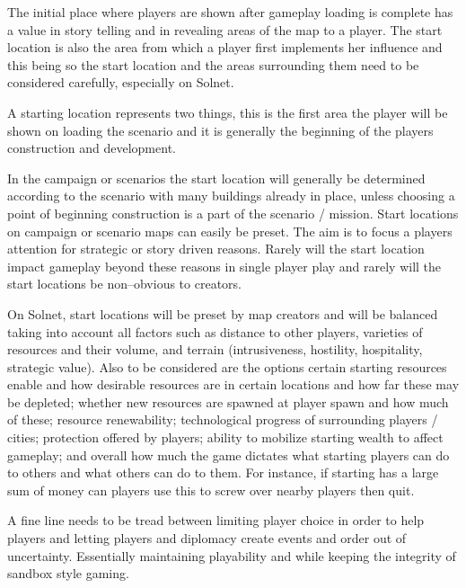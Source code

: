 
The initial place where players are shown after gameplay loading is complete has a value in story telling and in revealing areas of the map to a player. The start location is also the area from which a player first implements her influence and this being so the start location and the areas surrounding them need to be considered carefully, especially on Solnet.

A starting location represents two things, this is the first area the player will be shown on loading the scenario and it is generally the beginning of the players construction and development.  

In the campaign or scenarios the start location will generally be determined according to the scenario with many buildings already in place, unless choosing a point of beginning construction is a part of the scenario / mission. Start locations on campaign or scenario maps can easily be preset. The aim is to focus a players attention for strategic or story driven reasons. Rarely will the start location impact gameplay beyond these reasons in single player play and rarely will the start locations be non--obvious to creators.

On Solnet, start locations will be preset by map creators and will be balanced taking into account all factors such as distance to other players, varieties of resources and their volume, and terrain (intrusiveness, hostility, hospitality, strategic value). Also to be considered are the options certain starting resources enable and how desirable resources are in certain locations and how far these may be depleted; whether new resources are spawned at player spawn and how much of these; resource renewability; technological progress of surrounding players / cities; protection offered by players; ability to mobilize starting wealth to affect gameplay; and overall how much the game dictates what starting players can do to others and what others can do to them. For instance, if starting has a large sum of money can players use this to screw over nearby players then quit.

A fine line needs to be tread between limiting player choice in order to help players and letting players and diplomacy create events and order out of uncertainty. Essentially maintaining playability and while keeping the integrity of sandbox style gaming.


